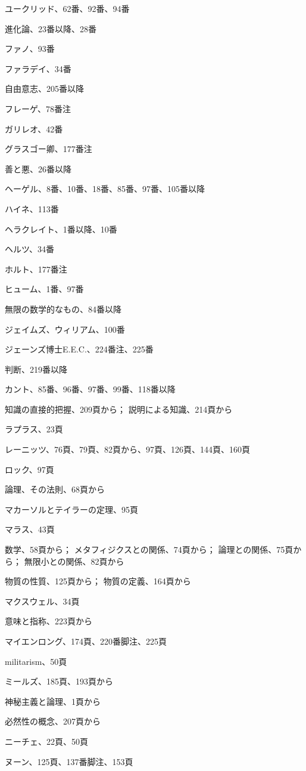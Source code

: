 \documentclass[a4paper,11pt,openany]{ltjsbook}
\begin{document}
ユークリッド、62番、92番、94番

進化論、23番以降、28番


ファノ、93番

ファラデイ、34番

自由意志、205番以降

フレーゲ、78番注


ガリレオ、42番

グラスゴー卿、177番注

善と悪、26番以降


ヘーゲル、8番、10番、18番、85番、97番、105番以降

ハイネ、113番

ヘラクレイト、1番以降、10番

ヘルツ、34番

ホルト、177番注

 ヒューム、1番、97番


無限の数学的なもの、84番以降


ジェイムズ、ウィリアム、100番

ジェーンズ博士E.E.C.、224番注、225番

判断、219番以降


カント、85番、96番、97番、99番、118番以降

知識の直接的把握、209頁から；
  説明による知識、214頁から


ラプラス、23頁


レーニッツ、76頁、79頁、82頁から、97頁、126頁、144頁、160頁


ロック、97頁


論理、その法則、68頁から


マカーソルとテイラーの定理、95頁


マラス、43頁


数学、58頁から；
  メタフィジクスとの関係、74頁から；
  論理との関係、75頁から；
  無限小との関係、82頁から


物質の性質、125頁から；
  物質の定義、164頁から


マクスウェル、34頁


意味と指称、223頁から


マイエンロング、174頁、220番脚注、225頁


 militarism、50頁


ミールズ、185頁、193頁から

神秘主義と論理、1頁から


必然性の概念、207頁から

ニーチェ、22頁、50頁

ヌーン、125頁、137番脚注、153頁
\end{document}

